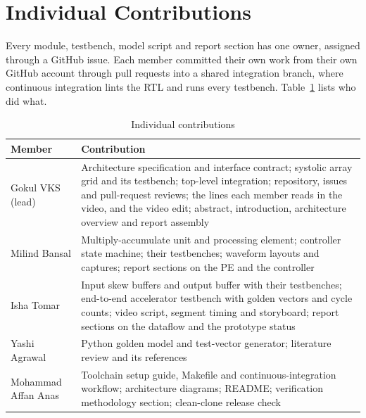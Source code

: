 
\section{Individual Contributions}
Every module, testbench, model script and report section has one owner, assigned through a GitHub issue. Each member committed their own work from their own GitHub account through pull requests into a shared integration branch, where continuous integration lints the RTL and runs every testbench. Table~\ref{tab:contrib} lists who did what.

\begin{table}[ht]
\centering
\caption{Individual contributions}
\label{tab:contrib}
\footnotesize
\begin{tabular}{@{}>{\raggedright\arraybackslash}p{}>{\raggedright\arraybackslash}p{}@{}}
\toprule
Member & Contribution \\
\midrule
Gokul VKS (lead) & Architecture specification and interface contract; systolic array grid and its testbench; top-level integration; repository, issues and pull-request reviews; the lines each member reads in the video, and the video edit; abstract, introduction, architecture overview and report assembly \\
\addlinespace
Milind Bansal & Multiply-accumulate unit and processing element; controller state machine; their testbenches; waveform layouts and captures; report sections on the PE and the controller \\
\addlinespace
Isha Tomar & Input skew buffers and output buffer with their testbenches; end-to-end accelerator testbench with golden vectors and cycle counts; video script, segment timing and storyboard; report sections on the dataflow and the prototype status \\
\addlinespace
Yashi Agrawal & Python golden model and test-vector generator; literature review and its references \\
\addlinespace
Mohammad Affan Anas & Toolchain setup guide, Makefile and continuous-integration workflow; architecture diagrams; README; verification methodology section; clean-clone release check \\
\bottomrule
\end{tabular}
\end{table}
